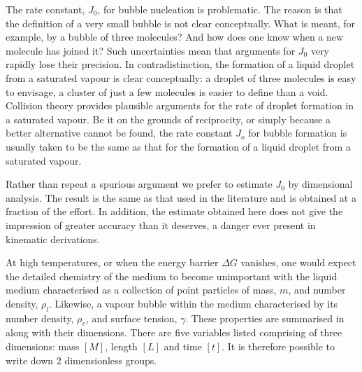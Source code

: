 The rate constant, $J_0$, for bubble nucleation is problematic.
The reason is that the definition of a very small bubble is not clear conceptually.
What is meant, for example, by a bubble of three molecules?
And how does one know when a new molecule has joined it?
Such uncertainties mean that arguments for $J_0$ very rapidly lose their precision.
In contradistinction, the formation of a liquid droplet from a saturated vapour is clear conceptually:
a droplet of three molecules is easy to envisage, 
a cluster of just a few molecules is easier to define than a void.
Collision theory provides plausible arguments for the rate of droplet formation in a saturated vapour\cite{Katz1973}.
%
Be it on the grounds of reciprocity, or simply because a better alternative cannot be found,
the rate constant $J_o$ for bubble formation is usually taken to be the same 
as that for the formation of a liquid droplet from a saturated vapour\cite{Nyquist1995}.


Rather than repeat a spurious argument we prefer to estimate $J_0$ by dimensional analysis.
The result is the same as that used in the literature and is obtained at a fraction of the effort.
In addition, the estimate obtained here does not give the impression of greater accuracy than it deserves,
a danger ever present in kinematic derivations.


At high temperatures, or when the energy barrier $\Delta G$ vanishes,
one would expect the detailed chemistry of the medium to become unimportant
with the liquid medium characterised as a collection of point particles of mass, $m$, and number density, $\rho_l$.
Likewise, a vapour bubble within the medium characterised by its number density, $\rho_v$, 
and surface tension, $\gamma$.
These properties are summarised in  along with their dimensions.
There are five variables listed comprising of three dimensions: mass $[M]$, length $[L]$ and time $[t]$.
It is therefore possible to write down 2 dimensionless groups\cite{Goldreich1999}.



